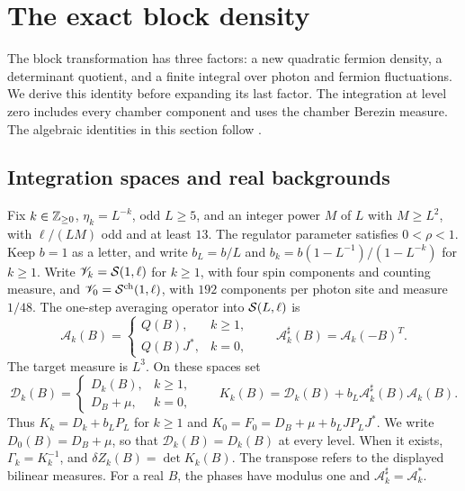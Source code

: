 \section{The exact block density}\label{sec:rg-step}

The block transformation has three factors: a new quadratic
fermion density, a determinant quotient, and a finite integral
over photon and fermion fluctuations. We derive this identity
before expanding its last factor. The integration at level
zero includes every chamber component and uses the chamber
Berezin measure. The algebraic identities in this section follow
\cite[\S13.1--13.3]{QED3Master}.

\subsection{Integration spaces and real backgrounds}
\label{subsec:rg-step-real-background}

Fix $k\in\mathbb Z_{\ge0}$, $\eta_k=L^{-k}$, odd $L\ge5$, and an
integer power $M$ of $L$ with $M\ge L^2$, with $\ell/(LM)$ odd and at least $13$.
The regulator parameter satisfies $0<\rho<1$.
Keep $b=1$ as a letter, and write
$b_L=b/L$ and
$b_k=b(1-L^{-1})/(1-L^{-k})$ for $k\ge1$.
Write $\mathscr V_k=\mathcal S(1,\ell)$ for $k\ge1$, with
four spin components and counting measure, and
$\mathscr V_0=\mathcal S^{\mathrm{ch}}(1,\ell)$, with
$192$ components per photon site and measure $1/48$.
The one-step averaging operator into $\mathcal S(L,\ell)$ is
\[
 \mathcal A_k(B)=
 \begin{cases}
 Q(B),&k\ge1,\\
 Q(B)J^*,&k=0,
 \end{cases}
 \qquad
 \mathcal A_k^\sharp(B)=\mathcal A_k(-B)^T.
\]
The target measure is $L^3$. On these spaces set
\begin{equation}\label{eq:rg-step-quadratic-operators}
 \mathcal D_k(B)=
 \begin{cases}D_k(B),&k\ge1,\\D_B+\mu,&k=0,\end{cases}
 \qquad
 K_k(B)=\mathcal D_k(B)+b_L\mathcal A_k^\sharp(B)\mathcal A_k(B).
\end{equation}
Thus $K_k=D_k+b_LP_L$ for $k\ge1$ and
$K_0=F_0=D_B+\mu+b_LJP_LJ^*$.
We write $D_0(B)=D_B+\mu$, so that
$\mathcal D_k(B)=D_k(B)$ at every level.
When it exists, $\Gamma_k=K_k^{-1}$, and
$\delta Z_k(B)=\det K_k(B)$.
The transpose refers to the displayed bilinear measures.
For a real $B$, the phases have modulus one and
$\mathcal A_k^\sharp=\mathcal A_k^*$.

